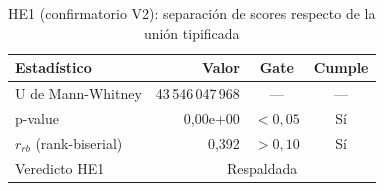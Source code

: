 \begin{table}[htbp]
\centering
\small
\caption{HE1 (confirmatorio V2): separación de scores respecto de la unión tipificada}
\label{tab:v2-he1-mwu}
\begin{tabular}{lrcc}
\toprule
Estadístico & Valor & Gate & Cumple \\
\midrule
  U de Mann-Whitney & 43\,546\,047\,968 & --- & --- \\
  p-value & 0,00e+00 & $< 0,05$ & Sí \\
  $r_{rb}$ (rank-biserial) & 0,392 & $> 0,10$ & Sí \\
\midrule
  Veredicto HE1 & \multicolumn{3}{c}{Respaldada} \\
\bottomrule
\end{tabular}
\end{table}
